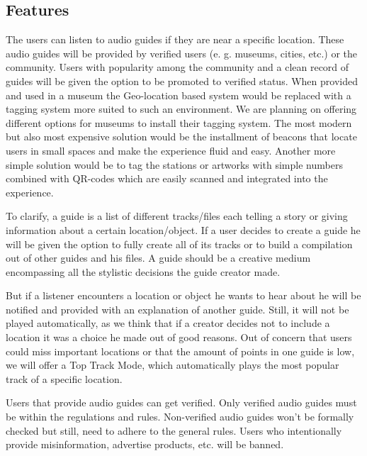 \documentclass[12pt]{article}
\theoremstyle{definition}
\newenvironment{text}{
}{}
\begin{document}
\subsection{Features}
\begin{text}
The users can listen to audio guides if they are near a specific location. These audio guides will be provided by verified users (e. g. museums, cities, etc.) or the community. Users with popularity among the community and a clean record of guides will be given the option to be promoted to verified status.
When provided and used in a museum the Geo-location based system would be replaced with a tagging system more suited to such an environment.
We are planning on offering different options for museums to install their tagging system. The most modern but also most expensive solution would be the installment of beacons that locate users in small spaces and make the experience fluid and easy.
Another more simple solution would be to tag the stations or artworks with simple numbers combined with QR-codes which are easily scanned and integrated into the experience.\newline
 
To clarify, a guide is a list of different tracks/files each telling a story or giving information about a certain location/object. If a user decides to create a guide he will be given the option to fully create all of its tracks or to build a compilation out of other guides and his files. A guide should be a creative medium encompassing all the stylistic decisions the guide creator made. \newline

But if a listener encounters a location or object he wants to hear about he will be notified and provided with an explanation of another guide. Still, it will not be played automatically, as we think that if a creator decides not to include a location it was a choice he made out of good reasons.
Out of concern that users could miss important locations or that the amount of points in one guide is low, we will offer a Top Track Mode, which automatically plays the most popular track of a specific location.\newline
 
Users that provide audio guides can get verified. Only verified audio guides must be within the regulations and rules. Non-verified audio guides won’t be formally checked but still, need to adhere to the general rules. Users who intentionally provide misinformation, advertise products, etc. will be banned.\newline
 

\end{text}
\end{document}
